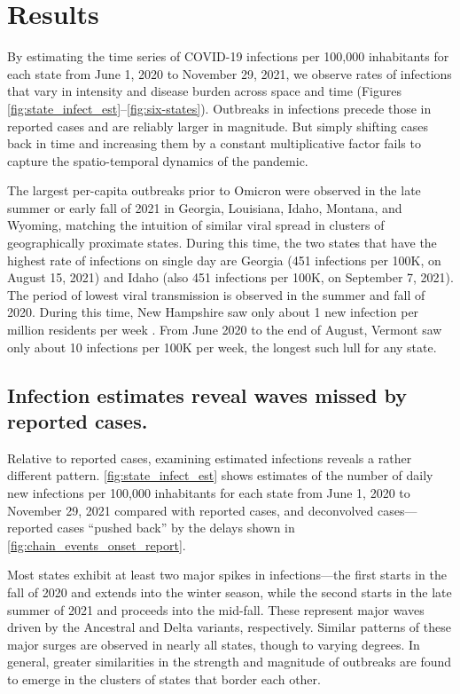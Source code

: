 \section{Results}
\label{sec:results}

By estimating the time series of COVID-19 infections per 100,000 inhabitants
for each \US state from June 1, 2020 to November 29, 2021, we observe rates of
infections that vary in intensity and disease burden across space and time
(Figures \ref{fig:state_infect_est}--\ref{fig:six-states}). Outbreaks in
infections precede those in reported cases and are reliably larger in magnitude.
But simply shifting cases back in time and increasing them by a constant
multiplicative factor fails to capture the spatio-temporal dynamics of the
pandemic. 

The largest per-capita outbreaks prior to Omicron were observed in the late
summer or early fall of 2021 in Georgia, Louisiana, Idaho, Montana, and Wyoming,
matching the intuition of similar viral spread in clusters of geographically
proximate states. During this time, the two states that have the highest rate of
infections on single day are Georgia (451 infections per 100K, on August 15,
2021) and Idaho (also 451 infections per 100K, on September 7, 2021). The period
of lowest viral transmission is observed in the summer and fall of 2020. During
this time, New Hampshire saw only about 1 new infection per million residents
per week . From June 2020 to the end of August, Vermont saw only
about 10 infections per 100K per week, the longest such lull for any state.



\subsection{Infection estimates reveal waves missed by reported cases.}
\label{sec:omitted-waves}

Relative to reported cases, examining estimated infections reveals a
rather different pattern. \autoref{fig:state_infect_est} shows
estimates of the number of daily new infections per 100,000 inhabitants for each
\US state from June 1, 2020 to November 29, 2021 compared with reported cases,
and deconvolved cases---reported cases ``pushed back'' by the delays shown in
\autoref{fig:chain_events_onset_report}. 

Most states exhibit at least two major spikes in infections---the first starts
in the fall of 2020 and extends into the winter season, while the second starts
in the late summer of 2021 and proceeds into the mid-fall. These represent major
waves driven by the Ancestral and Delta variants, respectively. Similar patterns
of these major surges are observed in nearly all states, though to varying
degrees. In general, greater similarities in the strength and magnitude of
outbreaks are found to emerge in the clusters of states that border each other.

